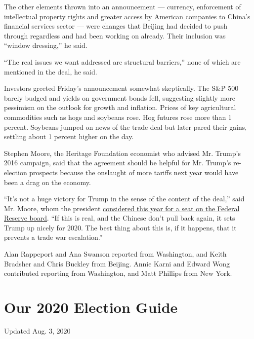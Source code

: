 The other elements thrown into an announcement --- currency, enforcement
of intellectual property rights and greater access by American companies
to China's financial services sector --- were changes that Beijing had
decided to push through regardless and had been working on already.
Their inclusion was ``window dressing,'' he said.

``The real issues we want addressed are structural barriers,'' none of
which are mentioned in the deal, he said.

Investors greeted Friday's announcement somewhat skeptically. The S\&P
500 barely budged and yields on government bonds fell, suggesting
slightly more pessimism on the outlook for growth and inflation. Prices
of key agricultural commodities such as hogs and soybeans rose. Hog
futures rose more than 1 percent. Soybeans jumped on news of the trade
deal but later pared their gains, settling about 1 percent higher on the
day.

Stephen Moore, the Heritage Foundation economist who advised Mr. Trump's
2016 campaign, said that the agreement should be helpful for Mr. Trump's
re-election prospects because the onslaught of more tariffs next year
would have been a drag on the economy.

``It's not a huge victory for Trump in the sense of the content of the
deal,'' said Mr. Moore, whom the president
\href{https://www.nytimes.com/2019/05/02/business/stephen-moore-fed.html}{considered
this year for a seat on the Federal Reserve board}. ``If this is real,
and the Chinese don't pull back again, it sets Trump up nicely for 2020.
The best thing about this is, if it happens, that it prevents a trade
war escalation.''

Alan Rappeport and Ana Swanson reported from Washington, and Keith
Bradsher and Chris Buckley from Beijing. Annie Karni and Edward Wong
contributed reporting from Washington, and Matt Phillips from New York.

\hypertarget{our-2020-election-guide}{%
\section{Our 2020 Election Guide}\label{our-2020-election-guide}}

Updated Aug. 3, 2020

